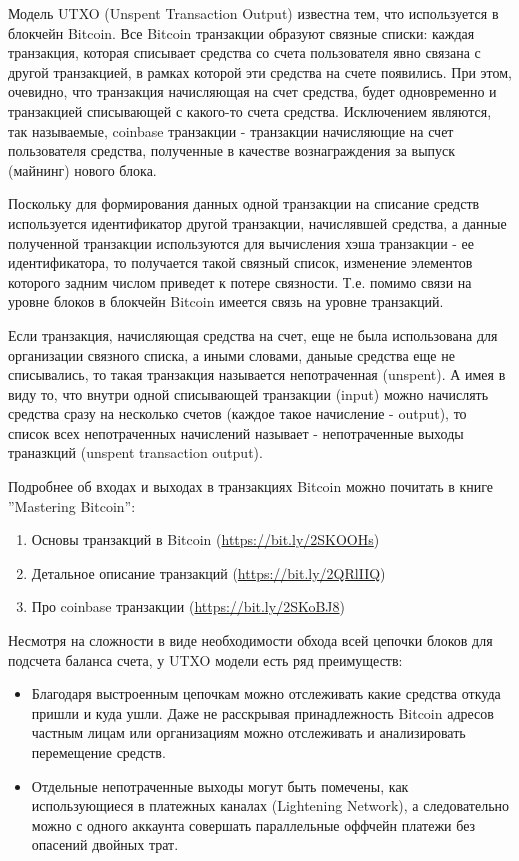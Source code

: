 
Модель UTXO (Unspent Transaction Output) известна тем, что используется в блокчейн Bitcoin. Все Bitcoin транзакции образуют связные списки: каждая транзакция, которая списывает средства со счета пользователя явно связана с другой транзакцией, в рамках которой эти средства на счете появились. При этом, очевидно, что транзакция начисляющая на счет средства, будет одновременно и транзакцией списывающей с какого-то счета средства. Исключением являются, так называемые, coinbase транзакции - транзакции начисляющие на счет пользователя средства, полученные в качестве вознаграждения за выпуск (майнинг) нового блока.

Поскольку для формирования данных одной транзакции на списание средств используется идентификатор другой транзакции, начислявшей средства, а данные полученной транзакции используются для вычисления хэша транзакции - ее идентификатора, то получается такой связный список, изменение элементов которого задним числом приведет к потере связности. Т.е. помимо связи на уровне блоков в блокчейн Bitcoin имеется связь на уровне транзакций.

Если транзакция, начисляющая средства на счет, еще не была использована для организации связного списка, а иными словами, даныые средства еще не списывались, то такая транзакция называется непотраченная (unspent). А имея в виду то, что внутри одной списывающей транзакции (input) можно начислять средства сразу на несколько счетов (каждое такое начисление - output), то список всех непотраченных начислений называет - непотраченные выходы траназкций (unspent transaction output).

Подробнее об входах и выходах в транзакциях Bitcoin можно почитать в книге ''Mastering Bitcoin'':

\begin{enumerate}
    \item Основы транзакций в Bitcoin (\url{https://bit.ly/2SKOOHs})
    \item Детальное описание транзакций (\url{https://bit.ly/2QRlIIQ})
    \item Про coinbase транзакции (\url{https://bit.ly/2SKoBJ8})
\end{enumerate}

Несмотря на сложности в виде необходимости обхода всей цепочки блоков для подсчета баланса счета, у UTXO модели есть ряд преимуществ:

\begin{itemize}
    \item Благодаря выстроенным цепочкам можно отслеживать какие средства откуда пришли и куда ушли. Даже не расскрывая принадлежность Bitcoin адресов частным лицам или организациям можно отслеживать и анализировать перемещение средств.
    \item Отдельные непотраченные выходы могут быть помечены, как использующиеся в платежных каналах (Lightening Network), а следовательно можно с одного аккаунта совершать параллельные оффчейн платежи без опасений двойных трат.
\end{itemize}

